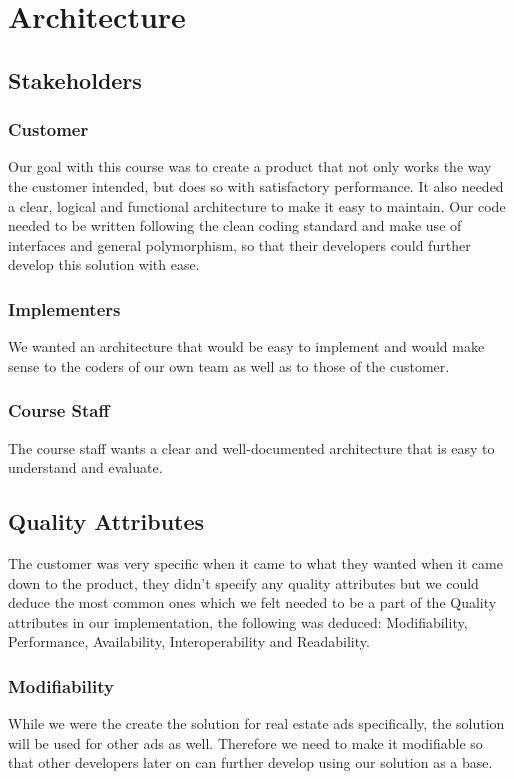 \section{Architecture}
\label{Architecture}
\subsection{Stakeholders}

\subsubsection{Customer}
Our goal with this course was to create a product that not only works the way the customer intended, but does so with satisfactory performance. It also needed a clear, logical and functional architecture to make it easy to maintain. 
Our code needed to be written following the clean coding standard and make use of interfaces and general polymorphism, so that their developers could further develop this solution with ease.

\subsubsection{Implementers}
We wanted an architecture that would be easy to implement and would make sense to the coders of our own team as well as to those of the customer.

\subsubsection{Course Staff}
The course staff wants a clear and well-documented architecture that is easy to understand and evaluate.


\subsection{Quality Attributes}
The customer was very specific when it came to what they wanted when it came down to the product, they didn't specify any quality attributes but we could deduce the most common ones which we felt needed to be a part of the Quality attributes in our implementation, the following was deduced: Modifiability, Performance, Availability, Interoperability and Readability. 

\subsubsection{Modifiability}
While we were the create the solution for real estate ads specifically, the solution will be used for other ads as well. Therefore we need to make it modifiable so that other developers later on can further develop using our solution as a base.


